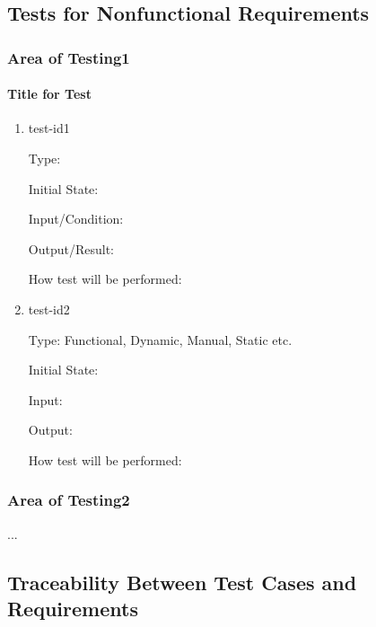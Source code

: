 \documentclass[12pt, titlepage]{article}
\begin{document}
\subsection{Tests for Nonfunctional Requirements}



\subsubsection{Area of Testing1}
		
\paragraph{Title for Test}

\begin{enumerate}

\item{test-id1\\}

Type: 
					
Initial State: 
					
Input/Condition: 
					
Output/Result: 
					
How test will be performed: 
					
\item{test-id2\\}

Type: Functional, Dynamic, Manual, Static etc.
					
Initial State: 
					
Input: 
					
Output: 
					
How test will be performed: 

\end{enumerate}

\subsubsection{Area of Testing2}

...

\subsection{Traceability Between Test Cases and Requirements}
\end{document}
